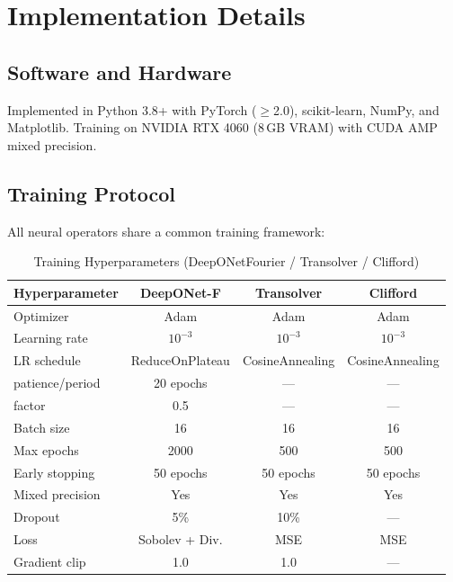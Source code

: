 \documentclass[conference]{IEEEtran}
\begin{document}
\section{Implementation Details}
\label{sec:impl}

\subsection{Software and Hardware}

Implemented in Python 3.8+ with PyTorch ($\geq$2.0), scikit-learn, NumPy, and Matplotlib. Training on NVIDIA RTX 4060 (8\,GB VRAM) with CUDA AMP mixed precision.

\subsection{Training Protocol}

All neural operators share a common training framework:

\begin{table}[htbp]
\caption{Training Hyperparameters (DeepONetFourier / Transolver / Clifford)}
\label{tab:training}
\centering
\begin{tabular}{lccc}
\toprule
\textbf{Hyperparameter} & \textbf{DeepONet-F} & \textbf{Transolver} & \textbf{Clifford} \\
\midrule
Optimizer & Adam & Adam & Adam \\
Learning rate & $10^{-3}$ & $10^{-3}$ & $10^{-3}$ \\
LR schedule & ReduceOnPlateau & CosineAnnealing & CosineAnnealing \\
  \quad patience/period & 20 epochs & --- & --- \\
  \quad factor & 0.5 & --- & --- \\
Batch size & 16 & 16 & 16 \\
Max epochs & 2000 & 500 & 500 \\
Early stopping & 50 epochs & 50 epochs & 50 epochs \\
Mixed precision & Yes & Yes & Yes \\
Dropout & 5\% & 10\% & --- \\
Loss & Sobolev + Div. & MSE & MSE \\
Gradient clip & 1.0 & 1.0 & --- \\
\bottomrule
\end{tabular}
\end{table}
\end{document}
